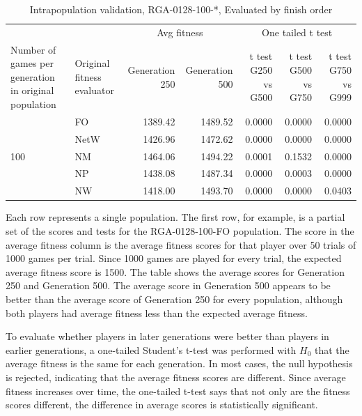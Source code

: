 \begin{table}[htbp]
  \centering
  \caption{Intrapopulation validation, RGA-0128-100-*, Evaluated by finish
  order}
    \begin{tabularx}{\linewidth}{|p{1in}|p{1in}|r|r|r|r|r|}
    \cline{3-7}
    \multicolumn{1}{l}{} &  & \multicolumn{2}{c|}{Avg fitness} & \multicolumn{3}{c|}{One tailed t test} \\
    \cline{1-7}
    Number of games per generation in original population
    & Original fitness evaluator
    & \multicolumn{1}{p{0.7in}|}{Generation 250}
    & \multicolumn{1}{p{0.7in}|}{Generation 500}
    & \multicolumn{1}{X|}{t test G250 vs G500}
    & \multicolumn{1}{X|}{t test G500 vs G750}
    & \multicolumn{1}{X|}{t test G750 vs G999} \\
    \cline{1-7}
      \multirow{5}{*}{100}
      & FO & 1389.42 & 1489.52 & 0.0000 & 0.0000 & 0.0000 \\
      \cline{2-7}
      & NetW & 1426.96 & 1472.62 & 0.0000 & 0.0000 & 0.0000 \\
      \cline{2-7}
      & NM & 1464.06 & 1494.22 & 0.0001 & 0.1532 & 0.0000 \\
      \cline{2-7}
      & NP & 1438.08 & 1487.34 & 0.0000 & 0.0003 & 0.0000 \\
      \cline{2-7}
      & NW & 1418.00 & 1493.70 & 0.0000 & 0.0000 & 0.0403 \\
      \cline{1-7}
    \end{tabularx}%
  \label{tab:validationRGA0128}%
\end{table}%

Each row represents a single population. The first row, for example, is a
partial set of the scores and tests for the RGA-0128-100-FO population. The
score in the average fitness column is the average fitness scores for that
player over 50 trials of 1000 games per trial. Since 1000 games are played for
every trial, the expected average fitness score is 1500. The table shows the
average scores for Generation 250 and Generation 500. The average score in
Generation 500 appears to be better than the average score of Generation 250 for
every population, although both players had average fitness less than the
expected average fitness.

To evaluate whether players in later generations were better than players in
earlier generations, a one-tailed Student's t-test was performed with $H_{0}$
that the average fitness is the same for each generation. In most cases, the
null hypothesis is rejected, indicating that the average fitness scores are
different. Since average fitness increases over time, the one-tailed t-test says
that not only are the fitness scores different, the difference in average scores
is statistically significant.


